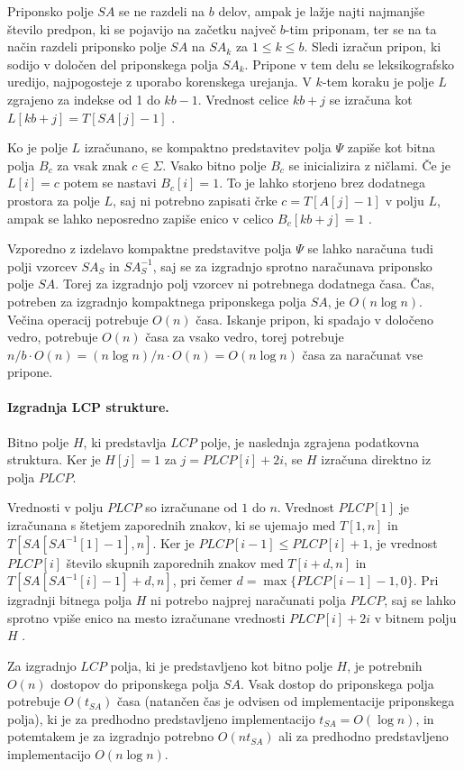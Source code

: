 Priponsko polje $SA$ se ne razdeli na $b$ delov, ampak je lažje najti najmanjše število predpon, ki se pojavijo na začetku največ $b$-tim priponam, ter se na ta način razdeli priponsko polje $SA$ na $SA_k$ za $1\le k\le b$. Sledi izračun pripon, ki sodijo v določen del priponskega polja $SA_k$. Pripone v tem delu se leksikografsko uredijo, najpogosteje z uporabo korenskega urejanja. V $k$-tem koraku je polje $L$ zgrajeno za indekse od 1 do $kb-1$. Vrednost celice $kb+j$ se izračuna kot $L[kb+j]=T[SA[j]-1]$ \cite{Navarro2016}.

Ko je polje $L$ izračunano, se kompaktno predstavitev polja $\Psi$ zapiše kot bitna polja $B_c$ za vsak znak $c\in \Sigma$. Vsako bitno polje $B_c$ se inicializira z ničlami. Če je $L[i]=c$ potem se nastavi $B_c[i]=1$. To je lahko storjeno brez dodatnega prostora za polje $L$, saj ni potrebno zapisati črke $c=T[A[j]-1]$ v polju $L$, ampak se lahko neposredno zapiše enico v celico $B_c[kb+j]=1$ \cite{Navarro2016}.

Vzporedno z izdelavo kompaktne predstavitve polja $\Psi$ se lahko naračuna tudi polji vzorcev $SA_S$ in $SA_S^{-1}$, saj se za izgradnjo sprotno naračunava priponsko polje $SA$. Torej za izgradnjo polj vzorcev ni potrebnega dodatnega časa. Čas, potreben za izgradnjo kompaktnega priponskega polja $SA$, je $O(n\log{n})$. Večina operacij potrebuje $O(n)$ časa. Iskanje pripon, ki spadajo v določeno vedro, potrebuje $O(n)$ časa za vsako vedro, torej potrebuje $n/b\cdot O(n)=(n\log{n})/n\cdot O(n)=O(n\log{n})$ časa za naračunat vse pripone. 

\paragraph{Izgradnja LCP strukture.}
Bitno polje $H$, ki predstavlja $LCP$ polje, je naslednja zgrajena podatkovna struktura. Ker je $H[j]=1$ za $j=PLCP[i]+2i$, se $H$ izračuna direktno iz polja $PLCP$.

Vrednosti v polju $PLCP$ so izračunane od $1$ do $n$. Vrednost $PLCP[1]$ je izračunana s štetjem zaporednih znakov, ki se ujemajo med $T[1,n]$ in $T[SA[SA^{-1}[1]-1],n]$. Ker je $PLCP[i-1]\le PLCP[i]+1$, je vrednost $PLCP[i]$ število skupnih zaporednih znakov med $T[i+d,n]$ in $T[SA[SA^{-1}[i]-1]+d,n]$, pri čemer $d=\max\{PLCP[i-1]-1,0\}$.
Pri izgradnji bitnega polja $H$ ni potrebo najprej naračunati polja $PLCP$, saj se lahko sprotno vpiše enico na mesto izračunane vrednosti $PLCP[i]+2i$ v bitnem polju $H$ \cite{Navarro2016}.

Za izgradnjo $LCP$ polja, ki je predstavljeno kot bitno polje $H$, je potrebnih $O(n)$ dostopov do priponskega polja $SA$. Vsak dostop do priponskega polja potrebuje $O(t_{SA})$ časa (natančen čas je odvisen od implementacije priponskega polja), ki je za predhodno predstavljeno implementacijo $t_{SA}= O(\log{n})$, in potemtakem je za izgradnjo potrebno $O(nt_{SA})$ ali za predhodno predstavljeno implementacijo $O(n\log{n})$.

